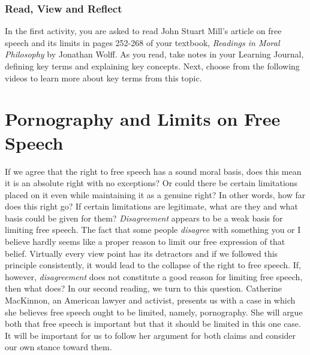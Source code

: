 \documentclass[
]{book}
\begin{document}
\begin{reflect}
\hypertarget{read-view-and-reflect-15}{%
\subsubsection*{Read, View and Reflect}\label{read-view-and-reflect-15}}

In the first activity, you are asked to read John Stuart Mill's article on free speech and its limits in pages 252-268 of your textbook, \emph{Readings in Moral Philosophy} by Jonathan Wolff. As you read, take notes in your Learning Journal, defining key terms and explaining key concepts.
Next, choose from the following videos to learn more about key terms from this
topic.
\end{reflect}

\hypertarget{pornography-and-limits-on-free-speech}{%
\section*{Pornography and Limits on Free Speech}\label{pornography-and-limits-on-free-speech}}

If we agree that the right to free speech has a sound moral basis, does this
mean it is an absolute right with no exceptions? Or could there be certain
limitations placed on it even while maintaining it as a genuine right? In other
words, how far does this right go? If certain limitations are legitimate, what
are they and what basis could be given for them?
\emph{Disagreement} appears to be a weak basis for limiting free speech. The fact that some people \emph{disagree} with something you or I believe hardly seems like a proper reason to limit our free expression of that belief. Virtually every view point has its detractors and if we followed this principle consistently, it would lead to the collapse of the right to free speech. If, however, \emph{disagreement} does not constitute a good reason for limiting free speech, then what does?
In our second reading, we turn to this question. Catherine MacKinnon, an American lawyer and activist, presents us with a case in which she believes free speech ought to be limited, namely, pornography. She will argue both that free speech is important but that it should be limited in this one case. It will be important for us to follow her argument for both claims and consider our own stance toward them.
\end{document}
